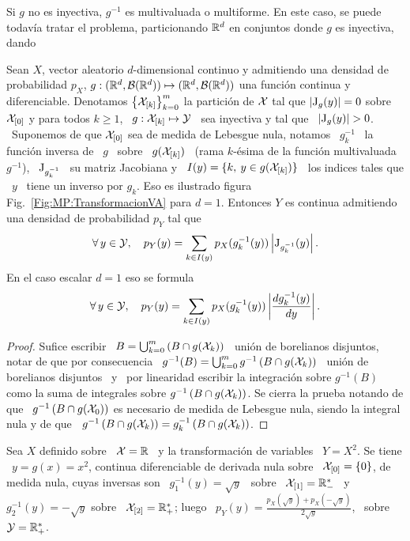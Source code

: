 Si $g$ no es inyectiva, $g^{-1}$  es multivaluada o multiforme. En este caso, se
puede todav\'ia  tratar el problema, particionando $\mathbb{R}^d$  en conjuntos donde
$g$ es inyectiva, dando
%
\begin{teorema}
  Sean $X$, vector aleatorio  $d$-dimensional continuo y admitiendo una densidad
  de  probabilidad   $p_X$,  $g:(\mathbb{R}^d  ,  \mathcal{B}(\mathbb{R}^d))   \mapsto  (\mathbb{R}^d  ,
  \mathcal{B}(\mathbb{R}^d))$  una  funci\'on continua  y  diferenciable.  Denotamos  $\left\{
    \mathcal{X}_{[k]} \right\}_{k=0}^m$ la partici\'on  de $\mathcal{X}$ tal que $\left| \operatorname{J}_g(y)
  \right| = 0$ sobre  $\mathcal{X}_{[0]}$ y para todos $k \ge 1$,  \ $g: \mathcal{X}_{[k]} \mapsto
  \mathcal{Y}$ \ sea inyectiva y tal que \ $\left| \operatorname{J}_g(y) \right| > 0$. \ Suponemos de
  que  $\mathcal{X}_{[0]}$ sea  de medida  de Lebesgue  nula, notamos  \ $g_k^{-1}$  \ la
  funci\'on inversa de  \ $g$ \ sobre \ $g(\mathcal{X}_{[k]})$ \  (rama $k$-\'esima de la
  funci\'on multivaluada $g^{-1}$), \  $\operatorname{J}_{g_k^{-1}}$ \ su matriz Jacobiana y
  \ $I(y) = \{ k, \: y \in g(\mathcal{X}_{[k]}) \}$ \ los indices tales que \ $y$ \ tiene
  un      inverso     por      $g_k$.      Eso      es      ilustrado     figura
  Fig.~\ref{Fig:MP:TransformacionVA}  para $d  = 1$.   Entonces $Y$  es continua
  admitiendo una densidad de probabilidad $p_Y$ tal que
  \[
  \forall  \, y  \in \mathcal{Y},  \quad p_Y(y)  = \sum_{k  \in  I(y)} p_X(g_k^{-1}(y))
  \left| \operatorname{J}_{g_k^{-1}}(y) \right|.
  \]
  En el caso escalar $d = 1$ eso se formula
  \[
  \forall \, y \in \mathcal{Y}, \quad  p_Y(y) = \sum_{k \in I(y)} p_X(g_k^{-1}(y)) \left|
    \frac{d g_k^{-1}(y)}{dy} \right|.
  \]
\end{teorema}
%
\begin{proof}
  Sufice escribir  \ $B  = \bigcup_{k =  0}^m \left(  B \cap g(\mathcal{X}_k)  \right)$ \
  uni\'on de borelianos disjuntos, notar  de que por consecuencia \ $g^{-1}(B) =
  \bigcup_{k =0}^m g^{-1}\left( B \cap  g(\mathcal{X}_k) \right)$ \ uni\'on de borelianos
  disjuntos \  y \  por linearidad escribir  la integraci\'on  sobre $g^{-1}(B)$
  como la  suma de  integrales sobre $g^{-1}\left(  B \cap g(\mathcal{X}_k)  \right)$. Se
  cierra la  prueba notando de  que \ $g^{-1}\left(  B \cap g(\mathcal{X}_0)  \right)$ es
  necesario  de medida de  Lebesgue nula,  siendo la  integral nula  y de  que \
  $g^{-1}\left( B \cap g(\mathcal{X}_k) \right) = g_k^{-1}\left( B \cap g(\mathcal{X}_k) \right)$.
\end{proof}
%

\begin{ejemplo}
  Sea $X$ definido sobre  \ $\mathcal{X} = \mathbb{R}$ \ y la  transformaci\'on de variables \
  $Y = X^2$.   Se tiene \ $y  = g(x) = x^2$, continua  diferenciable de derivada
  nula  sobre \  $\mathcal{X}_{[0]} =  \{ 0  \}$, de  medida nula,  cuyas inversas  son \
  $g_1^{-1}(y) = \sqrt{y}$ \ sobre \ $\mathcal{X}_{[1]} = \mathbb{R}_-^*$ \ y \ $g_2^{-1}(y) =
  -   \sqrt{y}$  sobre   \   $\mathcal{X}_{[2]}   =  \mathbb{R}_+^*$;   luego   \  $p_Y(y)   =
  \frac{p_X(\sqrt{y})  +   p_X(-\sqrt{y})}{2  \sqrt{y}}$,   \  sobre  \   $\mathcal{Y}  =
  \mathbb{R}_+^*$.
\end{ejemplo}

